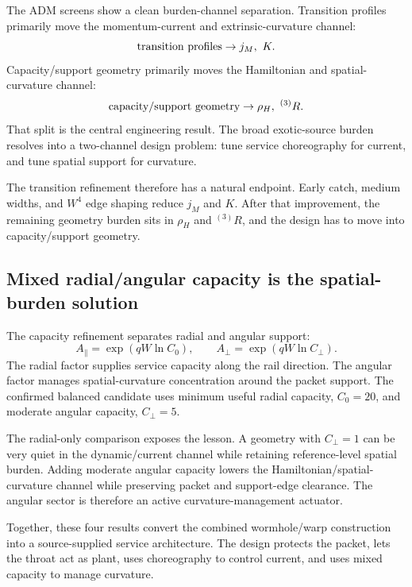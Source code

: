 \documentclass[11pt]{article}
\begin{document}
The ADM screens show a clean burden-channel separation. Transition profiles primarily move the momentum-current and extrinsic-curvature channel:
\begin{equation}
\hbox{transition profiles}\rightarrow j_M,\ K.
\end{equation}
Capacity/support geometry primarily moves the Hamiltonian and spatial-curvature channel:
\begin{equation}
\hbox{capacity/support geometry}\rightarrow \rho_H,\ {}^{(3)}R.
\end{equation}
That split is the central engineering result. The broad exotic-source burden resolves into a two-channel design problem: tune service choreography for current, and tune spatial support for curvature.

The transition refinement therefore has a natural endpoint. Early catch, medium widths, and $W^4$ edge shaping reduce $j_M$ and $K$. After that improvement, the remaining geometry burden sits in $\rho_H$ and ${}^{(3)}R$, and the design has to move into capacity/support geometry.

\subsection{Mixed radial/angular capacity is the spatial-burden solution}

The capacity refinement separates radial and angular support:
\begin{equation}
A_\parallel=\exp(qW\ln C_0),\qquad A_\perp=\exp(qW\ln C_\perp).
\end{equation}
The radial factor supplies service capacity along the rail direction. The angular factor manages spatial-curvature concentration around the packet support. The confirmed balanced candidate uses minimum useful radial capacity, $C_0=20$, and moderate angular capacity, $C_\perp=5$.

The radial-only comparison exposes the lesson. A geometry with $C_\perp=1$ can be very quiet in the dynamic/current channel while retaining reference-level spatial burden. Adding moderate angular capacity lowers the Hamiltonian/spatial-curvature channel while preserving packet and support-edge clearance. The angular sector is therefore an active curvature-management actuator.

Together, these four results convert the combined wormhole/warp construction into a source-supplied service architecture. The design protects the packet, lets the throat act as plant, uses choreography to control current, and uses mixed capacity to manage curvature.
\end{document}
